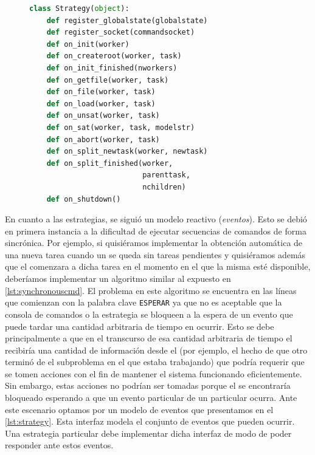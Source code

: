 \begin{figure}
\begin{footnotesize}
\begin{lstlisting}[language=Python,caption=Interfaz Strategy,label=lst:strategy]
class Strategy(object):
	def register_globalstate(globalstate)
	def register_socket(commandsocket)
	def on_init(worker)
	def on_createroot(worker, task)
	def on_init_finished(nworkers)
	def on_getfile(worker, task)
	def on_file(worker, task)
	def on_load(worker, task)
	def on_unsat(worker, task)
	def on_sat(worker, task, modelstr)
	def on_abort(worker, task)
	def on_split_newtask(worker, newtask)
	def on_split_finished(worker, 
	                      parenttask, 
	                      nchildren)
	def on_shutdown()
\end{lstlisting}
\end{footnotesize}
\vspace{-3em}
\end{figure}

En cuanto a las estrategias, se siguió un modelo reactivo (\emph{eventos}).
Esto se debió en primera instancia a la dificultad de ejecutar secuencias de
comandos de forma sincrónica. Por ejemplo, si quisiéramos implementar la
obtención automática de una nueva tarea cuando un \w se queda sin tareas
pendientes y quisiéramos además que el \w comenzara a \solvear dicha tarea en
el momento en el que la misma esté disponible, deberíamos implementar un
algoritmo similar al expuesto en \lst\ref{lst:synchronouscmd}. El problema en
este algoritmo se encuentra en las líneas que comienzan con la palabra clave
\texttt{ESPERAR} ya que no es aceptable que la consola de comandos o la
estrategia se bloqueen a la espera de un evento que puede tardar una cantidad
arbitraria de tiempo en ocurrir. Esto se debe principalmente a que en el
transcurso de esa cantidad arbitraria de tiempo el \fend recibiría una
cantidad de información desde el \bend (por ejemplo, el hecho de que otro \w
terminó de \solvear el subproblema en el que estaba trabajando) que podría
requerir que se tomen acciones con el fin de mantener el sistema funcionando
eficientemente. Sin embargo, estas acciones no podrían ser tomadas porque el
\fend se encontraría bloqueado esperando a que un evento particular de un \w
particular ocurra. Ante este escenario optamos por un modelo de eventos que
presentamos en el \lst\ref{lst:strategy}. Esta interfaz modela el conjunto de
eventos que pueden ocurrir. Una estrategia particular debe implementar dicha
interfaz de modo de poder responder ante estos eventos.


